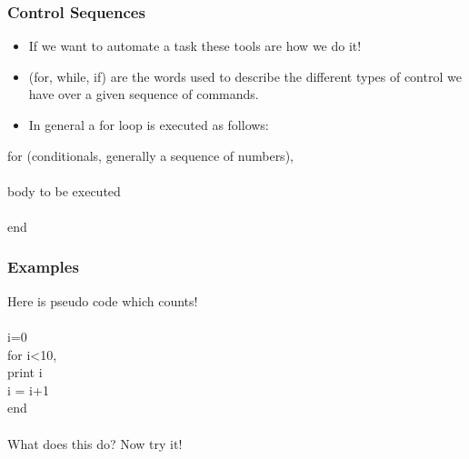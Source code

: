 \documentclass{beamer}
\begin{document}
\begin{frame}
\frametitle{Control Sequences} 

\begin{itemize}
\item If we want to automate a task these tools are how we do it! 
\item (for, while, if) are the words used to describe the different types of control we have over a given sequence of commands. 
\item In general a for loop is executed as follows: 
\end{itemize}

for (conditionals, generally a sequence of numbers), \\
\ \\


	\hspace{10mm} body to be executed \\
	\ \\
	
end
\end{frame}
%
\begin{frame}
\frametitle{Examples}

Here is pseudo code which counts! \\
\ \\
i=0
\ \\
for i<10, \\

\hspace{10mm} print i \\
\hspace{10mm} i = i+1 \\

end
\ \\
\ \\
What does this do? Now try it! 
\end{frame}
\end{document}
